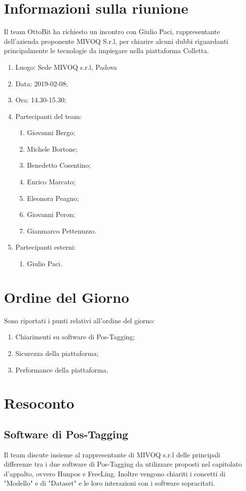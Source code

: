 \documentclass[11pt,a4paper]{article}
\begin{document}
	\section{Informazioni sulla riunione}
	Il team OttoBit ha richiesto un incontro con Giulio Paci, rappresentante dell'azienda proponente MIVOQ S.r.l, per chiarire alcuni dubbi riguardanti principalmente le tecnologie da impiegare nella piattaforma Colletta.
	\begin{enumerate}
		\item Luogo: Sede MIVOQ s.r.l, Padova
		\item Data: 2019-02-08;
		\item Ora: 14.30-15.30;
		\item Partecipanti del team:
		\begin{enumerate}
			\item Giovanni Bergo;
			\item Michele Bortone;
			\item Benedetto Cosentino;
			\item Enrico Marcato;
			\item Eleonora Peagno;
			\item Giovanni Peron;
			\item Gianmarco Pettenuzzo.
			
		\end{enumerate}
	\item Partecipanti esterni:
	\begin{enumerate}
		\item Giulio Paci.
	\end{enumerate}
	\end{enumerate}
	
	\section{Ordine del Giorno}
	Sono riportati i punti relativi all'ordine del giorno:
	\begin{enumerate}
		\item Chiarimenti su software di Pos-Tagging;
		\item Sicurezza della piattaforma;
		\item Performance della piattaforma.
	\end{enumerate}
	
	\section{Resoconto}
	\subsection{Software di Pos-Tagging}
	Il team discute insieme al rappresentante di MIVOQ s.r.l delle principali differenze tra i due software di Pos-Tagging da utilizzare proposti nel capitolato d'appalto, ovvero Hunpos e FreeLing.
	Inoltre vengono chiariti i concetti di "Modello" e di "Dataset" e le loro interazioni con i software sopracitati.
\end{document}
